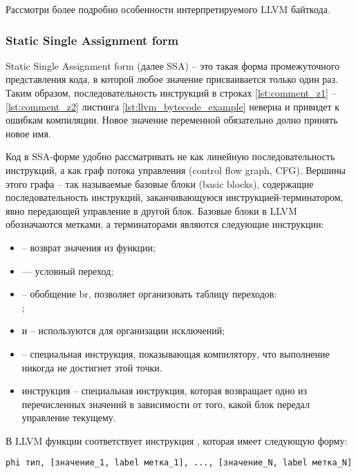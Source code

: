Рассмотри более подробно особенности интерпретируемого LLVM байткода.

\subsubsection{Static Single Assignment form}

Static Single Assignment form (далее SSA) -- это такая форма промежуточного представления кода,
в которой любое значение присваивается только один раз. Таким образом, последовательность инструкций
в строках \ref{lst:comment_z1} -- \ref{lst:comment_z2} листинга \ref{lst:llvm_bytecode_example} неверна
и привидет к ошибкам компиляции. Новое значение переменной обязательно долно принять новое имя.

Код в SSA-форме удобно рассматривать не как линейную последовательность инструкций,
а как граф потока управления (control flow graph, CFG). Вершины этого графа -- так
называемые базовые блоки (basic blocks), содержащие последовательность инструкций,
заканчивающуюся инструкцией-терминатором, явно передающей управление в другой блок.
Базовые блоки в LLVM обозначаются метками, а терминаторами являются следующие инструкции:
\begin{itemize}
    \item {} -- возврат значения из функции;
    \item {} — условный переход;
    \item {} -- обобщение br, позволяет организовать таблицу переходов:\\
        ;
    \item {} и  -- используются для организации исключений;
    \item {} -- специальная инструкция, показывающая компилятору, что выполнение никогда не достигнет этой точки.
    \item инструкция \varphi -- специальная инструкция, которая возвращает одно из перечисленных значений в зависимости от того,
        какой блок передал управление текущему.
\end{itemize}

В LLVM функции \varphi соответствует инструкция , которая имеет следующую форму:
\begin{verbatim}
phi тип, [значение_1, label метка_1], ..., [значение_N, label метка_N]
\end{verbatim}

